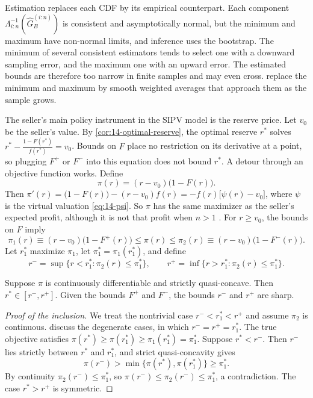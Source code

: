 Estimation replaces each CDF by its empirical counterpart. Each component $\Lambda_{i:n}^{-1}(\hat G_B^{(i:n)})$ is
consistent and asymptotically normal, but the minimum and maximum have non-normal limits, and inference uses the
bootstrap. The minimum of several consistent estimators tends to select one with a downward sampling error, and the
maximum one with an upward error. The estimated bounds are therefore too narrow in finite samples and may even cross.
\citet{HaileTamer2003} replace the minimum and maximum by smooth weighted averages that approach them as the sample
grows.

The seller's main policy instrument in the SIPV model is the reserve price. Let $v_0$ be the seller's value. By
\cref{cor:14-optimal-reserve}, the optimal reserve $r^*$ solves $r^*-\frac{1-F(r^*)}{f(r^*)}=v_0$. Bounds on $F$ place
no restriction on its derivative at a point, so plugging $F^+$ or $F^-$ into this equation does not bound $r^*$. A
detour through an objective function works. Define
\[
\pi(r)=(r-v_0)\big(1-F(r)\big).
\]
Then $\pi'(r)=\big(1-F(r)\big)-(r-v_0)f(r)=-f(r)\big[\psi(r)-v_0\big]$, where $\psi$ is the virtual valuation
\eqref{eq:14-psi}. So $\pi$ has the same maximizer as the seller's expected profit, although it is not that profit when
$n>1$ \citep[footnote~34]{AtheyHaile2007}. For $r\ge v_0$, the bounds on $F$ imply
\[
\pi_1(r)\equiv(r-v_0)\big(1-F^+(r)\big)\le\pi(r)\le\pi_2(r)\equiv(r-v_0)\big(1-F^-(r)\big).
\]
Let $r_1^*$ maximize $\pi_1$, let $\pi_1^*=\pi_1(r_1^*)$, and define
\[
r^-=\sup\{r<r_1^*:\pi_2(r)\le\pi_1^*\},\qquad r^+=\inf\{r>r_1^*:\pi_2(r)\le\pi_1^*\}.
\]

\begin{proposition}\label{prop:15-ht-reserve}
Suppose $\pi$ is continuously differentiable and strictly quasi-concave. Then $r^*\in[r^-,r^+]$. Given the bounds
$F^+$ and $F^-$, the bounds $r^-$ and $r^+$ are sharp.
\end{proposition}

\begin{proof}[Proof of the inclusion]
We treat the nontrivial case $r^-<r_1^*<r^+$ and assume $\pi_2$ is continuous.
\citet[Section~4.3.2]{AtheyHaile2007} discuss the degenerate cases, in which $r^-=r^+=r_1^*$. The true objective
satisfies
$\pi(r^*)\ge\pi(r_1^*)\ge\pi_1(r_1^*)=\pi_1^*$. Suppose $r^*<r^-$. Then $r^-$ lies strictly between $r^*$ and
$r_1^*$, and strict quasi-concavity gives
\[
\pi(r^-)>\min\{\pi(r^*),\pi(r_1^*)\}\ge\pi_1^* .
\]
By continuity $\pi_2(r^-)\le\pi_1^*$, so $\pi(r^-)\le\pi_2(r^-)\le\pi_1^*$, a contradiction. The case $r^*>r^+$ is
symmetric.
\end{proof}

